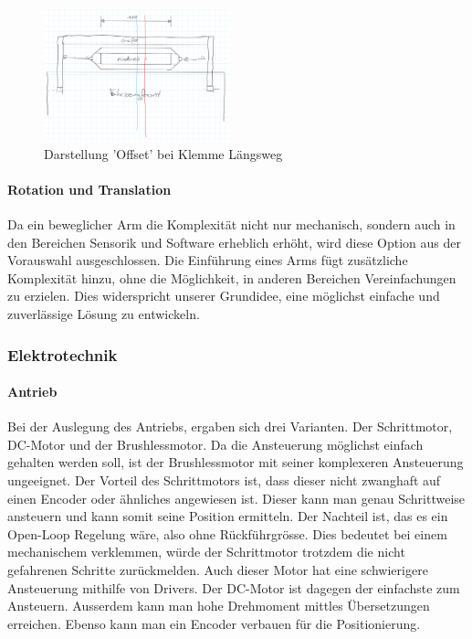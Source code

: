         \begin{figure}[h!]
            \centering
            \includegraphics[width=0.48\textwidth]{img/konzeptfindung/Klemme_Langsweg_off_center.png}
            \caption{Darstellung 'Offset' bei Klemme Längsweg}
        \label{img:konzept_zentrierung_3}
        \end{figure}  
                        
        \newpage         
        \paragraph{Rotation und Translation}
        Da ein beweglicher Arm die Komplexität nicht nur mechanisch, sondern auch in den Bereichen Sensorik und Software erheblich erhöht, wird diese Option aus der Vorauswahl ausgeschlossen. Die Einführung eines Arms fügt zusätzliche Komplexität hinzu, ohne die Möglichkeit, in anderen Bereichen Vereinfachungen zu erzielen. Dies widerspricht unserer Grundidee, eine möglichst einfache und zuverlässige Lösung zu entwickeln.

\subsubsection{Elektrotechnik}
    \paragraph{Antrieb}
    Bei der Auslegung des Antriebs, ergaben sich drei Varianten. Der Schrittmotor, DC-Motor und der Brushlessmotor. Da die Ansteuerung möglichst einfach gehalten werden soll, ist der Brushlessmotor mit seiner komplexeren Ansteuerung ungeeignet. Der Vorteil des Schrittmotors ist, dass dieser nicht zwanghaft auf einen Encoder oder ähnliches angewiesen ist. Dieser kann man genau Schrittweise ansteuern und kann somit seine Position ermitteln. Der Nachteil ist, das es ein Open-Loop Regelung wäre, also ohne Rückführgrösse. Dies bedeutet bei einem mechanischem verklemmen, würde der Schrittmotor trotzdem die nicht gefahrenen Schritte zurückmelden. Auch dieser Motor hat eine schwierigere Ansteuerung mithilfe von Drivers. Der DC-Motor ist dagegen der einfachste zum Ansteuern. Ausserdem kann man hohe Drehmoment mittles Übersetzungen erreichen. Ebenso kann man ein Encoder verbauen für die Positionierung.

